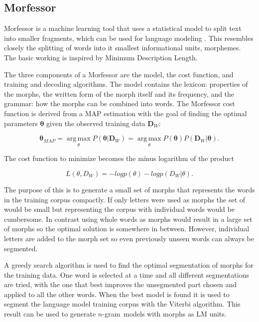 \documentclass[b5paper]{article}
\newcommand{\ngram}{$n$-gram}
\begin{document}
\subsection{Morfessor}
Morfessor is a machine learning tool that uses a statistical model to split text into smaller fragments, which can be used for language modeling \cite{creutz2007unsupervised}. This resembles closely the splitting of words into it smallest informational units, morphemes. The basic working is inspired by Minimum Description Length.

The three components of a Morfessor are the model, the cost function, and training and decoding algorithms. The model contains the lexicon: properties of the morphs, the written form of the morph itself and its frequency, and the grammar: how the morphs can be combined into words. The Morfessor cost function is derived from a MAP estimation with the goal of finding the optimal parameters $\bm{\theta}$ given the observed training data $\bm{D}_W$:

\begin{equation}
\bm{\theta}_{MAP}=\operatorname*{arg\,max}_{\theta}P(\bm{\theta}|\bm{D}_W)=\operatorname*{arg\,max}_{\theta}P(\bm{\theta})P(\bm{D}_W|\bm{\theta}).
\end{equation}

The cost function to minimize becomes the minus logarithm of the product

\begin{equation}
L(\theta, D_W)=-log p(\theta)-log p(D_W|\theta).
\end{equation}

The purpose of this is to generate a small set of morphs that represents the words in the training corpus compactly. If only letters were used as morphs the set of would be small but representing the corpus with individual words would be cumbersome. In contrast using whole words as morphs would result in a large set of morphs so the optimal solution is somewhere in between. However, individual letters are added to the morph set so even previously unseen words can always be segmented.

A greedy search algorithm is used to find the optimal segmentation of morphs for the training data. One word is selected at a time and all different segmentations are tried, with the one that best improves the unsegmented part chosen and applied to all the other words. When the best model is found it is used to segment the language model training corpus with the Viterbi algorithm. This result can be used to generate \ngram\ models with morphs as LM units.
\end{document}

